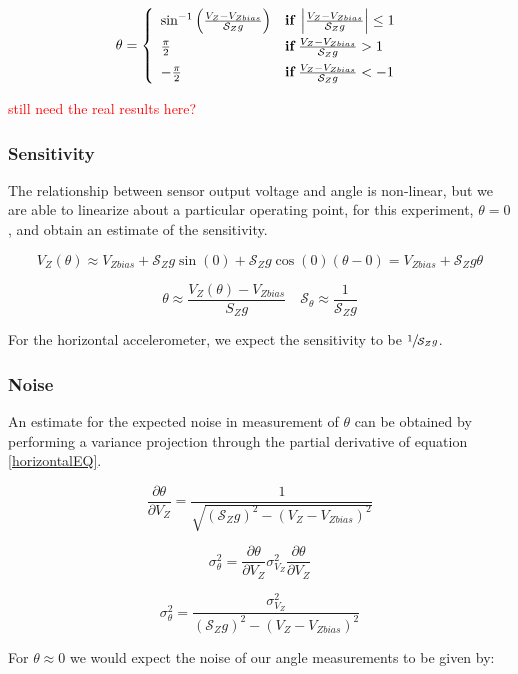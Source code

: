 \documentclass{article}
\newcommand{\xxx}[1]{\textcolor{red}{#1}}
\theoremstyle{plain}
\theoremstyle{definition}
\theoremstyle{remark}
\newcommand{\Sens}{\mathcal{S}}
\begin{document}
$$\theta = \left\{ 
	\begin{array}{l l}
		\sin^{-1} \left(\frac{V_{Z} - V_{Zbias}}{\Sens_{Z} g} \right) & {\bf{if }} \, \left| \frac{V_{Z} - V_{Zbias}}{\Sens_{Z} g} \right| \leq 1 \\[6pt]
		\frac{\pi}{2} & {\bf{if }} \, \frac{V_{Z} - V_{Zbias}}{\Sens_{Z} g} > 1 \\[6pt]
		-\frac{\pi}{2} & {\bf{if} } \, \frac{V_{Z} - V_{Zbias}}{\Sens_{Z} g} < -1
	\end{array} \right. $$

\xxx{still need the real results here?}

\subsubsection{Sensitivity}

The relationship between sensor output voltage and angle is non-linear, but we are able to linearize about a particular operating point, for this experiment, $\theta = 0$, and obtain an estimate of the sensitivity.

$$ V_{Z}(\theta) \approx V_{Zbias} + \Sens_{Z} g \sin(0) + \Sens_{Z} g \cos(0) \left(\theta - 0\right) = V_{Zbias} + \Sens_{Z} g \theta $$

$$ \theta \approx \frac{V_{Z}(\theta) - V_{Zbias}}{S_Z g}  \quad \Sens_\theta \approx \frac{1}{\Sens_Z g}$$

For the horizontal accelerometer, we expect the sensitivity to be $\sfrac{1}{\Sens_{Z} g}$. 

\subsubsection{Noise}

An estimate for the expected noise in measurement of $\theta$ can be obtained by performing a variance projection through the partial derivative of equation \ref{horizontalEQ}.

$$ \frac{\partial \theta}{\partial V_{Z}} =  \frac{1}{\sqrt{(\Sens_{Z} g)^2 - (V_{Z} - V_{Zbias})^2}}$$

$$ \sigma^2_{\theta} = \frac{\partial \theta}{\partial V_{Z}} \sigma^2_{V_{Z}} \frac{\partial \theta}{\partial V_{Z}} $$

$$ \sigma^2_{\theta} = \frac{\sigma^2_{V_{Z}}}{(\Sens_{Z} g)^2 - (V_{Z} - V_{Zbias})^2}$$

For $\theta \approx 0$ we would expect the noise of our angle measurements to be given by:
\end{document}
